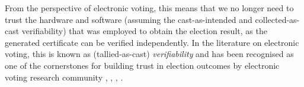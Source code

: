 From the perspective of electronic voting, this means that
we no longer need to trust the hardware and software (assuming the 
cast-as-intended and collected-as-cast verifiability)
that was employed to obtain the election result, as the generated
certificate can be verified independently. In the literature on
electronic voting, this is known as (tallied-as-cast) \emph{verifiability} and has
been recognised as one of the cornerstones for building trust in
election outcomes by electronic voting research community \citep{Chaum:2004:SBR}
 \citep{5958051}, \citep{Benaloh:1994:RSE:195058.195407},  \citep{Delaune:2010:VPT}, \citep{Bernhard:2017:PES}.
%
%

  


